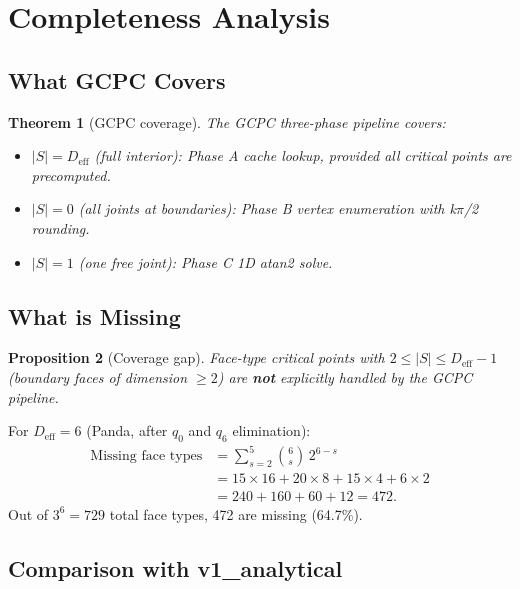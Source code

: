\documentclass[11pt,a4paper]{article}
\newtheorem{theorem}{Theorem}[section]
\newtheorem{proposition}[theorem]{Proposition}
\begin{document}
\section{Completeness Analysis}\label{sec:completeness}

\subsection{What GCPC Covers}

\begin{theorem}[GCPC coverage]\label{thm:coverage}
The GCPC three-phase pipeline covers:
\begin{itemize}
  \item $|S| = D_\text{eff}$ (full interior): Phase A cache lookup,
        provided all critical points are precomputed.
  \item $|S| = 0$ (all joints at boundaries): Phase B vertex
        enumeration with k$\pi$/2 rounding.
  \item $|S| = 1$ (one free joint): Phase C 1D atan2 solve.
\end{itemize}
\end{theorem}

\subsection{What is Missing}

\begin{proposition}[Coverage gap]\label{prop:gap}
Face-type critical points with $2 \le |S| \le D_\text{eff}-1$
(boundary faces of dimension $\ge 2$) are \textbf{not} explicitly
handled by the GCPC pipeline.
\end{proposition}

For $D_\text{eff} = 6$ (Panda, after $q_0$ and $q_6$ elimination):
\begin{align*}
  \text{Missing face types} &= \sum_{s=2}^{5} \binom{6}{s}\,2^{6-s} \\
  &= 15\times16 + 20\times8 + 15\times4 + 6\times2 \\
  &= 240 + 160 + 60 + 12 = 472.
\end{align*}
Out of $3^6 = 729$ total face types, 472 are missing (64.7\%).

\subsection{Comparison with v1\_analytical}
\end{document}
